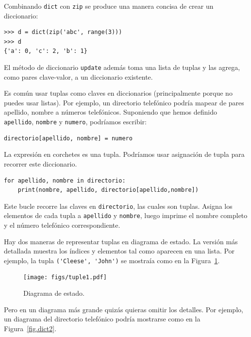 \documentclass[10pt]{book}
\begin{document}
Combinando {\tt dict} con {\tt zip} se produce una manera concisa
de crear un diccionario:

\begin{verbatim}
>>> d = dict(zip('abc', range(3)))
>>> d
{'a': 0, 'c': 2, 'b': 1}
\end{verbatim}
%
El método de diccionario {\tt update} además toma una lista de tuplas
y las agrega, como pares clave-valor, a un diccionario existente.

Es común usar tuplas como claves en diccionarios (principalmente porque
no puedes usar listas).  Por ejemplo, un directorio telefónico podría mapear
de pares apellido, nombre a números telefónicos.  Suponiendo
que hemos definido {\tt apellido}, {\tt nombre} y {\tt numero},
podríamos escribir:

\begin{verbatim}
directorio[apellido, nombre] = numero
\end{verbatim}
%
La expresión en corchetes es una tupla.  Podríamos usar asignación
de tupla para recorrer este diccionario.

\begin{verbatim}
for apellido, nombre in directorio:
    print(nombre, apellido, directorio[apellido,nombre])
\end{verbatim}
%
Este bucle recorre las claves en {\tt directorio}, las cuales son tuplas.  Asigna
los elementos de cada tupla a {\tt apellido} y {\tt nombre}, luego
imprime el nombre completo y el número telefónico correspondiente.

Hay dos maneras de representar tuplas en diagrama de estado.  La versión
más detallada muestra los índices y elementos tal como aparecen en
una lista.  Por ejemplo, la tupla \verb"('Cleese', 'John')" se mostraía
como en la Figura~\ref{fig.tuple1}.

\begin{figure}
\centerline
{\texttt{[image: figs/tuple1.pdf]}}
\caption{Diagrama de estado.}
\label{fig.tuple1}
\end{figure}

Pero en un diagrama más grande quizás quieras omitir los
detalles.  Por ejemplo, un diagrama del directorio telefónico podría
mostrarse como en la Figura~\ref{fig.dict2}.
\end{document}
